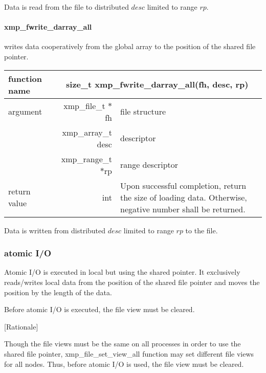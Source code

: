    Data is read from the file to distributed $desc$ limited to range $rp$.

   \paragraph{ xmp\_fwrite\_darray\_all} writes data cooperatively from the global array to the
   position of the shared file pointer.

   \begin{table}[h]
    \begin{center}
     \begin{tabular}{|l|r|p{80mm}|}
      \hline
      {\bf function name}  & \multicolumn{2}{c|}{\bf size\_t
      xmp\_fwrite\_darray\_all(fh, desc, rp)} \\ \hline \hline
      argument & xmp\_file\_t $*$fh & file structure \\ \cline{2-3}
      & xmp\_array\_t desc & descriptor \\ \cline{2-3}
      & xmp\_range\_t $*$rp & range descriptor \\ \hline
      return value & int & Upon successful completion, return the size
	      of loading data. Otherwise, negative number shall be
	      returned. \\ \hline
      \end{tabular}
     \end{center}
    \label{tb:aaa}
   \end{table}

   Data is written from distributed $desc$ limited to range $rp$ to the file.

   \clearpage

   \subsubsection{atomic I/O}

   Atomic I/O is executed in local but using the shared pointer. 
   It exclusively reads/writes local data
   from the position of the shared file pointer and moves the position by the length of the data.

   Before atomic I/O is executed, the file view must be cleared.
   
   [Rationale]

   Though the file views must be the same on all processes in order to use the shared file pointer,
   xmp\_file\_set\_view\_all
   function may set different file views for all nodes.
   Thus, before atomic I/O is used, the file view must be cleared.


